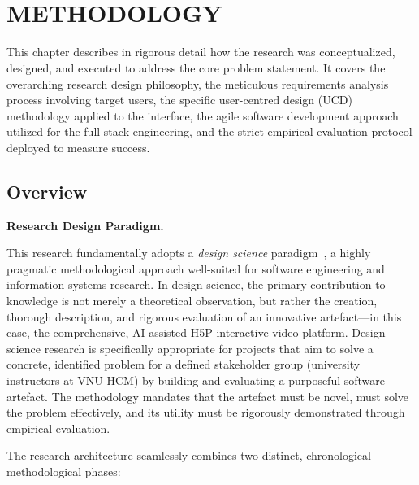 \chapter{\\METHODOLOGY}

This chapter describes in rigorous detail how the research was conceptualized, designed, and executed to address the core problem statement. It covers the overarching research design philosophy, the meticulous requirements analysis process involving target users, the specific user-centred design (UCD) methodology applied to the interface, the agile software development approach utilized for the full-stack engineering, and the strict empirical evaluation protocol deployed to measure success.

\section{Overview}

\textbf{Research Design Paradigm.}

This research fundamentally adopts a \emph{design science} paradigm~\cite{sommerville2016}, a highly pragmatic methodological approach well-suited for software engineering and information systems research. In design science, the primary contribution to knowledge is not merely a theoretical observation, but rather the creation, thorough description, and rigorous evaluation of an innovative artefact—in this case, the comprehensive, AI-assisted H5P interactive video platform. Design science research is specifically appropriate for projects that aim to solve a concrete, identified problem for a defined stakeholder group (university instructors at VNU-HCM) by building and evaluating a purposeful software artefact. The methodology mandates that the artefact must be novel, must solve the problem effectively, and its utility must be rigorously demonstrated through empirical evaluation.

The research architecture seamlessly combines two distinct, chronological methodological phases:

